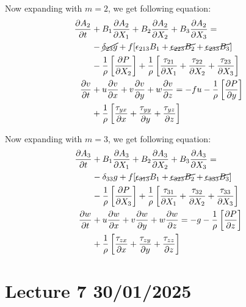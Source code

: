 \documentclass[fleqn,10pt]{SelfArx} %
\begin{document}
Now expanding with $m=2$, we get following equation:
\begin{align*}
	\frac{\partial A_2}{\partial t} & + B_1\frac{\partial A_2}{\partial X_1} + B_2\frac{\partial A_2}{\partial X_2} + B_3\frac{\partial A_2}{\partial X_3} =                                              \\  & -\cancel{\delta_{23}g} + f[\epsilon_{213}B_1 + \cancel{\epsilon_{223}B_2} + \cancel{\epsilon_{233}B_3}] \\ & -\frac{1}{\rho}\left[\frac{\partial P}{\partial X_2}\right] + \frac{1}{\rho}\left[\frac{\tau_{21}}{\partial X_1} + \frac{\tau_{22}}{\partial X_2} + \frac{\tau_{23}}{\partial X_3}\right] \\
	\frac{\partial v}{\partial t}   & + u\frac{\partial v}{\partial x} + v\frac{\partial v}{\partial y} + w\frac{\partial v}{\partial z} = -fu - \frac{1}{\rho}\left[\frac{\partial P}{\partial y}\right] \\ & + \frac{1}{\rho}\left[\frac{\tau_{yx}}{\partial x} + \frac{\tau_{yy}}{\partial y} + \frac{\tau_{yz}}{\partial z}\right]
\end{align*}

Now expanding with $m=3$, we get following equation:
\begin{align*}
	\frac{\partial A_3}{\partial t} & + B_1\frac{\partial A_3}{\partial X_1} + B_2\frac{\partial A_3}{\partial X_2} + B_3\frac{\partial A_3}{\partial X_3} =                                             \\  & -\delta_{33}g + f[\cancel{\epsilon_{313}}B_1 + \cancel{\epsilon_{323}B_2} + \cancel{\epsilon_{333}B_3}] \\ & -\frac{1}{\rho}\left[\frac{\partial P}{\partial X_3}\right] + \frac{1}{\rho}\left[\frac{\tau_{31}}{\partial X_1} + \frac{\tau_{32}}{\partial X_2} + \frac{\tau_{33}}{\partial X_3}\right] \\
	\frac{\partial w}{\partial t}   & + u\frac{\partial w}{\partial x} + v\frac{\partial w}{\partial y} + w\frac{\partial w}{\partial z} = -g - \frac{1}{\rho}\left[\frac{\partial P}{\partial z}\right] \\ & + \frac{1}{\rho}\left[\frac{\tau_{zx}}{\partial x} + \frac{\tau_{zy}}{\partial y} + \frac{\tau_{zz}}{\partial z}\right]
\end{align*}

\clearpage

\section{Lecture 7 30/01/2025}
\end{document}
